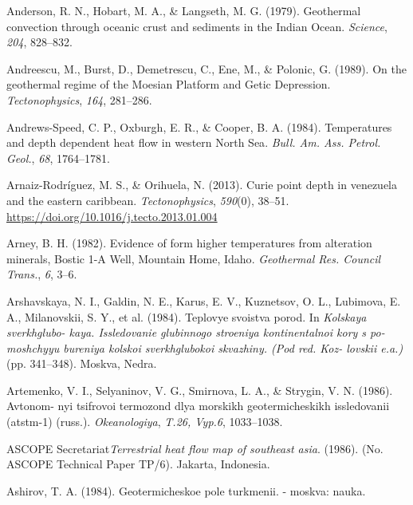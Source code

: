 \documentclass[draft,linenumbers]{agujournal2018}
\begin{document}
\leavevmode{}%
Anderson, R. N., Hobart, M. A., \& Langseth, M. G. (1979). Geothermal
convection through oceanic crust and sediments in the {Indian Ocean}.
\emph{Science}, \emph{204}, 828--832.

\leavevmode{}%
Andreescu, M., Burst, D., Demetrescu, C., Ene, M., \& Polonic, G.
(1989). On the geothermal regime of the {Moesian Platform and Getic
Depression}. \emph{Tectonophysics}, \emph{164}, 281--286.

\leavevmode{}%
Andrews-Speed, C. P., Oxburgh, E. R., \& Cooper, B. A. (1984).
Temperatures and depth dependent heat flow in western {North Sea}.
\emph{Bull. Am. Ass. Petrol. Geol.}, \emph{68}, 1764--1781.

\leavevmode{}%
Arnaiz-Rodríguez, M. S., \& Orihuela, N. (2013). Curie point depth in
venezuela and the eastern caribbean. \emph{Tectonophysics},
\emph{590}(0), 38--51. \url{https://doi.org/10.1016/j.tecto.2013.01.004}

\leavevmode{}%
Arney, B. H. (1982). Evidence of form higher temperatures from
alteration minerals, {Bostic 1-A Well, Mountain Home, Idaho}.
\emph{Geothermal Res. Council Trans.}, \emph{6}, 3--6.

\leavevmode{}%
Arshavskaya, N. I., Galdin, N. E., Karus, E. V., Kuznetsov, O. L.,
Lubimova, E. A., Milanovskii, S. Y., et al. (1984). Teplovye svoistva
porod. In \emph{Kolskaya sverkhglubo- kaya. Issledovanie glubinnogo
stroeniya kontinentalnoi kory s po- moshchyyu bureniya kolskoi
sverkhglubokoi skvazhiny. (Pod red. Koz- lovskii e.a.)} (pp. 341--348).
Moskva, Nedra.

\leavevmode{}%
Artemenko, V. I., Selyaninov, V. G., Smirnova, L. A., \& Strygin, V. N.
(1986). Avtonom- nyi tsifrovoi termozond dlya morskikh geotermicheskikh
issledovanii (atstm-1) (russ.). \emph{Okeanologiya}, \emph{T.26, Vyp.6},
1033--1038.

\leavevmode{}%
ASCOPE Secretariat\emph{Terrestrial heat flow map of southeast asia}.
(1986). (No. ASCOPE Technical Paper TP/6). Jakarta, Indonesia.

\leavevmode{}%
Ashirov, T. A. (1984). Geotermicheskoe pole turkmenii. - moskva: nauka.
\end{document}
